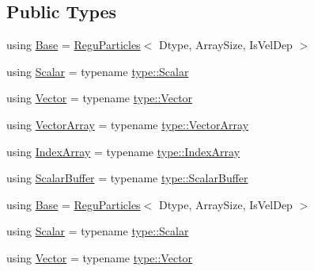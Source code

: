 \subsection*{Public Types}
\begin{DoxyCompactItemize}
\item 
using \mbox{\hyperlink{class_space_h_1_1_vel_indep_chain_particles_a071fb842f4ccb3ff01015c1105302e8a}{Base}} = \mbox{\hyperlink{class_space_h_1_1_regu_particles}{Regu\+Particles}}$<$ Dtype, Array\+Size, Is\+Vel\+Dep $>$
\item 
using \mbox{\hyperlink{class_space_h_1_1_vel_indep_chain_particles_a1538b2477abc1c908faba5f2915c25e4}{Scalar}} = typename \mbox{\hyperlink{struct_space_h_1_1_proto_type_af3c8245d83d9db64749882920de5c274}{type\+::\+Scalar}}
\item 
using \mbox{\hyperlink{class_space_h_1_1_vel_indep_chain_particles_a60fc302e36d670adbff46907a1d8180a}{Vector}} = typename \mbox{\hyperlink{struct_space_h_1_1_proto_type_a316b81f4660b2b4fab14a8e1f23b6089}{type\+::\+Vector}}
\item 
using \mbox{\hyperlink{class_space_h_1_1_vel_indep_chain_particles_a426b0d83a634a818998a8f29e89f983c}{Vector\+Array}} = typename \mbox{\hyperlink{struct_space_h_1_1_proto_type_a622b8e122b33bb4966a02299fb7b82d6}{type\+::\+Vector\+Array}}
\item 
using \mbox{\hyperlink{class_space_h_1_1_vel_indep_chain_particles_a48b9183f8d68fe8af42bf405125d450c}{Index\+Array}} = typename \mbox{\hyperlink{struct_space_h_1_1_proto_type_a276a37c81faf08681b57e8082f3f6c1b}{type\+::\+Index\+Array}}
\item 
using \mbox{\hyperlink{class_space_h_1_1_vel_indep_chain_particles_a82b6905aa4abfd82951138f0636b6b3f}{Scalar\+Buffer}} = typename \mbox{\hyperlink{struct_space_h_1_1_proto_type_a62c491884996da10377d348a5aabad86}{type\+::\+Scalar\+Buffer}}
\item 
using \mbox{\hyperlink{class_space_h_1_1_vel_indep_chain_particles_a071fb842f4ccb3ff01015c1105302e8a}{Base}} = \mbox{\hyperlink{class_space_h_1_1_regu_particles}{Regu\+Particles}}$<$ Dtype, Array\+Size, Is\+Vel\+Dep $>$
\item 
using \mbox{\hyperlink{class_space_h_1_1_vel_indep_chain_particles_a1538b2477abc1c908faba5f2915c25e4}{Scalar}} = typename \mbox{\hyperlink{struct_space_h_1_1_proto_type_af3c8245d83d9db64749882920de5c274}{type\+::\+Scalar}}
\item 
using \mbox{\hyperlink{class_space_h_1_1_vel_indep_chain_particles_a60fc302e36d670adbff46907a1d8180a}{Vector}} = typename \mbox{\hyperlink{struct_space_h_1_1_proto_type_a316b81f4660b2b4fab14a8e1f23b6089}{type\+::\+Vector}}

\end{DoxyCompactItemize}
